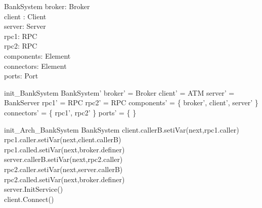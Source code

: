 \begin{schema}{BankSystem}
broker:  Broker \\
client :  Client \\
server: Server \\
rpc1: RPC \\
rpc2: RPC \\
components: \pset Element \\
connectors: \pset Element \\
ports: \pset Port 
\end{schema}

\begin{zed}
init\_BankSystem \sdef \lsch BankSystem' \bbar broker' = \new Broker  \land client' = \new ATM \land server' = \new BankServer 
\land rpc1' = \new RPC \land rpc2' = \new RPC \land components' = \{ broker', client', server' \} \land connectors' = \{ rpc1', rpc2' \} \land ports' = \{ \}  \rsch  \end{zed}

\begin{schema}{init\_Arch\_BankSystem}
\Delta BankSystem 
\where client.callerB.setiVar(next,rpc1.caller) \\
rpc1.caller.setiVar(next,client.callerB) \\
rpc1.called.setiVar(next,broker.definer) \\
server.callerB.setiVar(next,rpc2.caller) \\
rpc2.caller.setiVar(next,server.callerB) \\
rpc2.called.setiVar(next,broker.definer) \\
server.InitService() \\
client.Connect() 
\end{schema}

